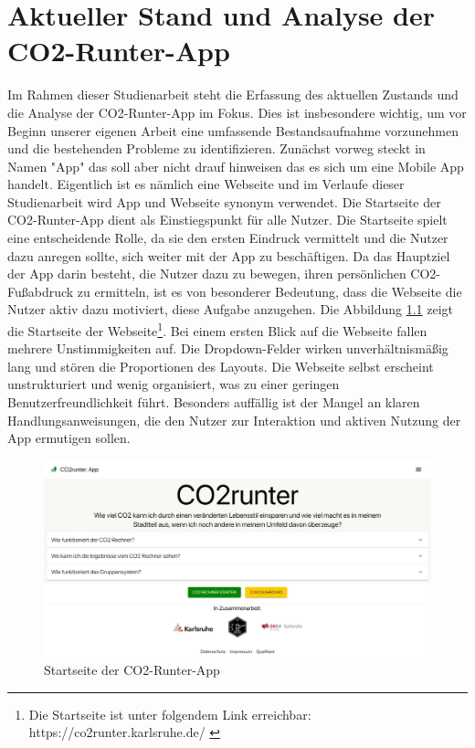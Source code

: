 
\chapter{Aktueller Stand und Analyse der CO2-Runter-App}
\label{chapter:2}

Im Rahmen dieser Studienarbeit steht die Erfassung des aktuellen Zustands und die Analyse der CO2-Runter-App im Fokus. Dies ist insbesondere wichtig, um vor Beginn unserer eigenen Arbeit eine umfassende Bestandsaufnahme vorzunehmen und die bestehenden Probleme zu identifizieren. Zunächst vorweg steckt in Namen "App" das soll aber nicht drauf hinweisen das es sich um eine Mobile App handelt. Eigentlich ist es nämlich eine Webseite und im Verlaufe dieser Studienarbeit wird App und Webseite synonym verwendet. Die Startseite der CO2-Runter-App dient als Einstiegspunkt für alle Nutzer. Die Startseite spielt eine entscheidende Rolle, da sie den ersten Eindruck vermittelt und die Nutzer dazu anregen sollte, sich weiter mit der App zu beschäftigen. Da das Hauptziel der App darin besteht, die Nutzer dazu zu bewegen, ihren persönlichen CO2-Fußabdruck zu ermitteln, ist es von besonderer Bedeutung, dass die Webseite die Nutzer aktiv dazu motiviert, diese Aufgabe anzugehen. Die Abbildung \ref{fig:co2runterapp-landingpage} zeigt die Startseite der Webseite\footnote{Die Startseite ist unter folgendem Link erreichbar: https://co2runter.karlsruhe.de/ \cite{co2runterapp}}. Bei einem ersten Blick auf die Webseite fallen mehrere Unstimmigkeiten auf. Die Dropdown-Felder wirken unverhältnismäßig lang und stören die Proportionen des Layouts. Die Webseite selbst erscheint unstrukturiert und wenig organisiert, was zu einer geringen Benutzerfreundlichkeit führt. Besonders auffällig ist der Mangel an klaren Handlungsanweisungen, die den Nutzer zur Interaktion und aktiven Nutzung der App ermutigen sollen.

\begin{figure}[h]
    \centering
    \includegraphics[width=1\textwidth]{images/02/CO2-Runter-App-Landingpage.jpeg}
    \caption{Startseite der CO2-Runter-App}
    \label{fig:co2runterapp-landingpage}
\end{figure}

